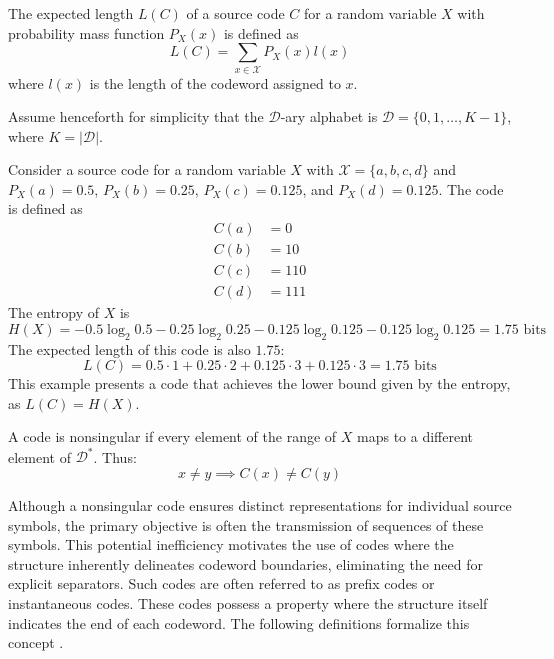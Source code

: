 \begin{definition}\label{def:expected_length}
    The expected length $L(C)$ of a source code $C$ for a random variable $X$ with probability mass function $P_X(x)$ is defined as
    \begin{equation*}
        L(C) = \sum_{x\in\mathcal{X}} P_X(x)l(x)
    \end{equation*}
    where $l(x)$ is the length of the codeword assigned to $x$.
\end{definition}

\noindent Assume henceforth for simplicity that the $\mathcal{D}$-ary alphabet is $\mathcal{D} = \{0, 1, \ldots, K-1\}$, where $K=|\mathcal{D}|$.

\begin{example}\label{ex:source_code}
    Consider a source code for a random variable $X$ with $\mathcal{X} = \{a, b, c, d\}$ and $P_X(a) = 0.5$, $P_X(b) = 0.25$, $P_X(c) = 0.125$, and $P_X(d) = 0.125$. The code is defined as
    \begin{align*}
        C(a) & = 0   \\
        C(b) & = 10  \\
        C(c) & = 110 \\
        C(d) & = 111
    \end{align*}
    The entropy of $X$ is
    \begin{equation*}
        H(X) = -0.5\log_2 0.5 - 0.25\log_2 0.25 - 0.125\log_2 0.125 - 0.125\log_2 0.125 = 1.75 \text{ bits}
    \end{equation*}
    The expected length of this code is also $1.75$:
    \begin{equation*}
        L(C) = 0.5 \cdot 1 + 0.25 \cdot 2 + 0.125 \cdot 3 + 0.125 \cdot 3 = 1.75 \text{ bits}
    \end{equation*}
    This example presents a code that achieves the lower bound given by the entropy, as $L(C) = H(X)$.
\end{example}

\begin{definition}\label{def:nonsingular_code}
    A code is nonsingular if every element of the range of $X$ maps to a different element of $\mathcal{D}^*$. Thus:
    \begin{equation*}
        x \neq y \implies C(x) \neq C(y)
    \end{equation*}
\end{definition}

\noindent Although a nonsingular code ensures distinct representations for individual source symbols, the primary objective is often the transmission of sequences of these symbols. This potential inefficiency motivates the use of codes where the structure inherently delineates codeword boundaries, eliminating the need for explicit separators. Such codes are often referred to as prefix codes or instantaneous codes. These codes possess a property where the structure itself indicates the end of each codeword. The following definitions formalize this concept \cite{ElementsofInformationTheory}.


